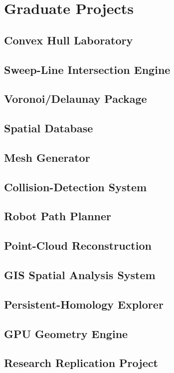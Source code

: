 \chapter{Graduate Projects}
\label{app:graduate_projects}


\section{Convex Hull Laboratory}
\label{sec:app_projects_convex_hull}

\section{Sweep-Line Intersection Engine}
\label{sec:app_projects_sweep_line}

\section{Voronoi/Delaunay Package}
\label{sec:app_projects_voronoi_delaunay}

\section{Spatial Database}
\label{sec:app_projects_spatial_database}

\section{Mesh Generator}
\label{sec:app_projects_mesh}

\section{Collision-Detection System}
\label{sec:app_projects_collision}

\section{Robot Path Planner}
\label{sec:app_projects_robot}

\section{Point-Cloud Reconstruction}
\label{sec:app_projects_reconstruction}

\section{GIS Spatial Analysis System}
\label{sec:app_projects_gis}

\section{Persistent-Homology Explorer}
\label{sec:app_projects_persistence}

\section{GPU Geometry Engine}
\label{sec:app_projects_gpu}

\section{Research Replication Project}
\label{sec:app_projects_research}
